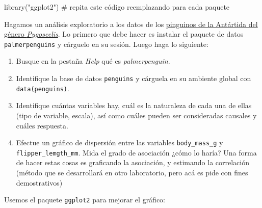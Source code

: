 \documentclass[
  letterpaper,
  DIV=11,
  numbers=noendperiod]{scrartcl}
\newenvironment{Shaded}{\begin{snugshade}}{\end{snugshade}}
\newcommand{\CommentTok}[1]{\textcolor[rgb]{0.37,0.37,0.37}{#1}}
\newcommand{\FunctionTok}[1]{\textcolor[rgb]{0.28,0.35,0.67}{#1}}
\newcommand{\NormalTok}[1]{\textcolor[rgb]{0.00,0.23,0.31}{#1}}
\newcommand{\SpecialCharTok}[1]{\textcolor[rgb]{0.37,0.37,0.37}{#1}}
\newcommand{\StringTok}[1]{\textcolor[rgb]{0.13,0.47,0.30}{#1}}
\providecommand{\tightlist}{%
  \setlength{\itemsep}{0pt}\setlength{\parskip}{0pt}}\usepackage{longtable,booktabs,array}
\begin{document}
\begin{Shaded}
\begin{Highlighting}[]
\FunctionTok{library}\NormalTok{(}\StringTok{"ggplot2"}\NormalTok{) }\CommentTok{\# repita este código reemplazando para cada paquete}
\end{Highlighting}
\end{Shaded}

Hagamos un análisis exploratorio a los datos de los
\href{https://doi.org/10.1371/journal.pone.0090081}{pinguinos de la
Antártida del género \emph{Pygoscelis}}. Lo primero que debe hacer es
instalar el paquete de datos \texttt{palmerpenguins} y cárguelo en su
sesión. Luego haga lo siguiente:

\begin{enumerate}
\def\labelenumi{\arabic{enumi}.}
\tightlist
\item
  Busque en la pestaña \emph{Help} qué es \emph{palmerpenguin}.
\item
  Identifique la base de datos \texttt{penguins} y cárguela en su
  ambiente global con \texttt{data(penguins)}.
\item
  Identifique cuántas variables hay, cuál es la naturaleza de cada una
  de ellas (tipo de variable, escala), así como cuáles pueden ser
  consideradas causales y cuáles respuesta.
\item
  Efectue un gráfico de dispersión entre las variables
  \texttt{body\_mass\_g} y \texttt{flipper\_lemgth\_mm}. Mida el grado
  de asociación ¿cómo lo haría? Una forma de hacer estas cosas es
  graficando la asociación, y estimando la correlación (método que se
  desarrollará en otro laboratorio, pero acá es pide con fines
  demostrativos)
\end{enumerate}

\begin{Shaded}
\end{Shaded}

Usemos el paquete \texttt{ggplot2} para mejorar el gráfico:
\end{document}
